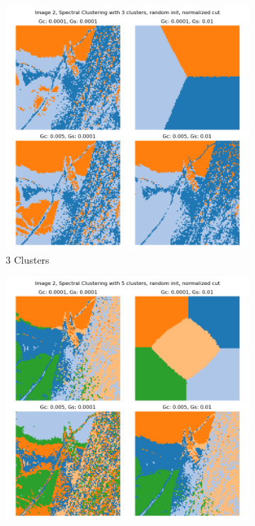 \documentclass{homework}
\begin{document}
\begin{figure}[H]
    \centering
    \begin{subfigure}{0.32\textwidth}
        \centering
        \includegraphics[width=\textwidth]{output_grid/image2_sc-normalized-random-3.png}
        \caption{3 Clusters}
    \end{subfigure}
    \begin{subfigure}{0.32\textwidth}
        \centering
        \includegraphics[width=\textwidth]{output_grid/image2_sc-normalized-random-5.png}

\end{subfigure}
\end{figure}
\end{document}
